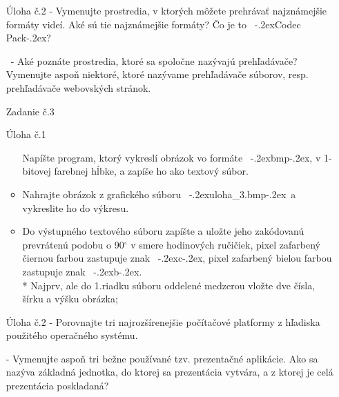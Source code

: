\documentclass[a4paper,twoside,12pt]{report}
\newcommand{\du}{\unskip\smash{\lower 1.4ex\hbox{\char34}}\kern-.2ex}
\newcommand{\hu}{\kern-.2ex\hbox{\char92}}
\begin{document}
{\begin{itemize}
\begin{itemize}
2: *******

\ldots

6: **
\end{itemize}

\item[Úloha č.2]
- Vymenujte prostredia, v ktorých môžete prehrávať najznámejšie formáty videí. Aké sú tie najznámejšie formáty? Čo je to \ \du Codec Pack\hu?

\ - Aké poznáte prostredia, ktoré sa spoločne nazývajú prehľadávače? Vymenuj\-te aspoň niektoré, ktoré nazývame prehľadávače súborov, resp. prehľadávače webovských stránok.
\end{itemize}
\vspace{-1.0cm}
\begin{itemize}
\item[Zadanie č.3]

\item[Úloha č.1]
\begin{itemize}
\item[]
Napíšte program, ktorý vykreslí obrázok vo formáte \ \du bmp\hu, v 1-bitovej farebnej hĺbke, a zapíše ho ako textový súbor. 
\item
Nahrajte obrázok z grafického súboru \ \du uloha\_3.bmp\hu \ a vykreslite ho do výkresu.
\item
Do výstupného textového súboru zapíšte a uložte jeho zak\' odovan\' u prevrátenú podobu o 90$^\circ$ v smere hodinových ručičiek, pixel zafarben\' y \v ciernou farbou zastupuje znak \ \du c\hu, pixel zafarben\' y bielou farbou zastupuje znak \ \du b\hu.
\\*
Najprv, ale do 1.riadku s\' uboru oddelené medzerou vlo\v zte dve čísla, šírku a výšku obrázka;
\end{itemize}

\item[Úloha č.2]
- Porovnajte tri najrozšírenejšie počítačové platformy z hľadiska použitého operačného systému.

- Vymenujte aspoň tri bežne používané tzv. prezentačné aplikácie. Ako sa nazýva základná jednotka, do ktorej sa prezentácia vytvára, a z ktorej je celá prezentácia poskladaná?
\end{itemize}
}%

\newpage
\end{document}
